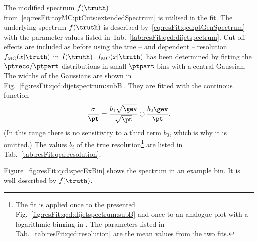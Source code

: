 \documentclass[a4paper]{cmspaper} %
\begin{document}
The modified spectrum $\tilde{f}(\truth)$ from~\eqref{eq:resFit:toyMC:ptCuts:extendedSpectrum} is utilised in the fit.
The underlying spectrum $f(\truth)$ is described by~\eqref{eq:resFit:qcd:ptGenSpectrum} with the parameter values listed in Tab.~\ref{tab:resFit:qcd:dijetspectrum}.
Cut-off effects are included as before using the true -- and \pt dependent -- resolution $f_{\text{MC}}(x|\truth)$ in $\tilde{f}(\truth)$.
$f_{\text{MC}}(x|\truth)$ has been determined by fitting the $\ptreco/\ptpart$ distributions in small $\ptpart$ bins with a central Gaussian.
The widths of the Gaussians are shown in Fig.~\ref{fig:resFit:qcd:dijetspectrum:subB}.
They are fitted with the continous function
\begin{equation}
  \label{eq:resFit:qcd:sigma}
  \frac{\sigma}{\pt} = \frac{b_{1}\sqrt{\gev}}{\sqrt{\pt}} \oplus \frac{b_{2}\gev}{\pt}.
\end{equation}
(In this \pt range there is no sensitivity to a third term $b_{0}$, which is why it is omitted.)
The values $b_{i}$ of the true resolution\footnote{The fit is applied once to the presented Fig.~\ref{fig:resFit:qcd:dijetspectrum:subB} and once to an analogue plot with a logarithmic binning in \ptpart.
The parameters listed in Tab.~\ref{tab:resFit:qcd:resolution} are the mean values from the two fits.}
are listed in Tab.~\ref{tab:resFit:qcd:resolution}.

Figure~\ref{fig:resFit:qcd:specExBin} shows the \ptpart spectrum in an example bin.
It is well described by $\tilde{f}(\truth)$.
\end{document}
